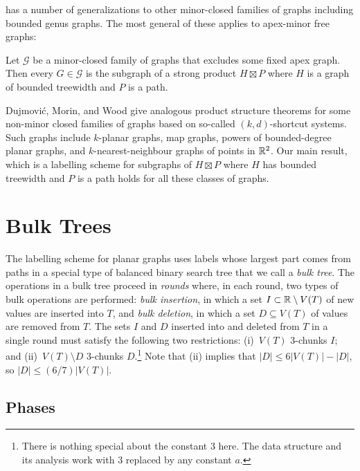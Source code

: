 \documentclass[kpfonts]{patmorin}
\begin{document}
 has a number of generalizations to other minor-closed families of graphs including bounded genus graphs.  The most general of these applies to apex-minor free graphs:

\begin{thm}
  Let $\mathcal{G}$ be a minor-closed family of graphs that excludes some fixed apex graph.  Then every $G\in\mathcal{G}$ is the subgraph of a strong product $H\boxtimes P$ where $H$ is a graph of bounded treewidth and $P$ is a path.
\end{thm}

Dujmović, Morin, and Wood \cite{dujmovic.morin.ea:structure} give analogous product structure theorems for some non-minor closed families of graphs based on so-called $(k,d)$-shortcut systems.  Such graphs include $k$-planar graphs, map graphs, powers of bounded-degree planar graphs, and $k$-nearest-neighbour graphs of points in $\mathbb{R}^2$.  Our main result, which is a labelling scheme for subgraphs of $H\boxtimes P$ where $H$ has bounded treewidth and $P$ is a path holds for all these classes of graphs.


\section{Bulk Trees}

The labelling scheme for planar graphs uses labels whose largest part comes from paths in a special type of balanced binary search tree that we call a \emph{bulk tree}.  The operations in a bulk tree proceed in \emph{rounds} where, in each round, two types of bulk operations are performed: \emph{bulk insertion}, in which a set $I\subset \mathbb{R}\setminus V(T)$ of new values are inserted into $T$, and \emph{bulk deletion}, in which a set $D\subseteq V(T)$ of values are removed from $T$. The sets $I$ and $D$ inserted into and deleted from $T$ in a single round must satisfy the following two restrictions: (i)~$V(T)$ $3$-chunks $I$; and (ii)~$V(T)\setminus D$ 3-chunks $D$.\footnote{There is nothing special about the constant $3$ here.  The data structure and its analysis work with $3$ replaced by any constant $a$.}  Note that (ii) implies that $|D|\le 6|V(T)|-|D|$, so $|D|\le (6/7)|V(T)|$.

\subsection{Phases}
\end{document}
